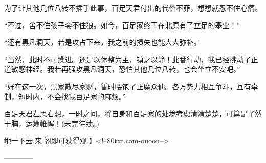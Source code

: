 \begin{this_body}
为了让其他几位八转不插手此事，百足天君付出的代价不菲，想想就忍不住心痛。

“不过，舍不住孩子套不住狼。如今，百足家终于在北原有了立足的基业！”

“还有黑凡洞天，若是攻占下来，我之前的损失也能大大弥补。”

“当然，此时不可躁进。还是以休整为主，镇之以静！此番行动，我已经挑动了正道敏感神经。我若再强攻黑凡洞天，恐怕其他几位八转，也会坐立不安吧。”

“好在这一次，黑家散尽家财，暂时喂饱了正魔众仙。各方势力相互争斗，互有牵制，短时内，不会找我百足家的麻烦。”

百足天君左思右想，一时之间，将自身和百足家的处境考虑清清楚楚，可算是了然于胸，运筹帷幄！(未完待续。)

地一下云.来.阁即可获得观.】<!--80txt.com-ouoou-->

------------

\end{this_body}

